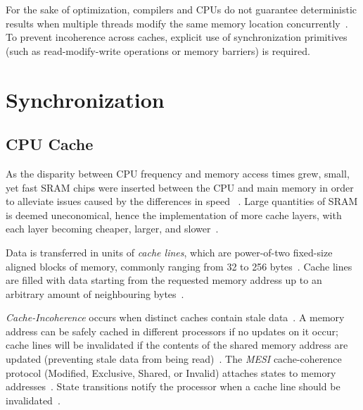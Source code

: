 For the sake of optimization, compilers and CPUs do not guarantee deterministic
results when multiple threads modify the same memory location
concurrently~\citep{drepper2007every}. To prevent incoherence across caches,
explicit use of synchronization primitives (such as read-modify-write
operations or memory barriers) is required.

\section{Synchronization}
\subsection{CPU Cache}
As the disparity between CPU frequency and memory access times grew, small, yet
fast SRAM chips were inserted between the CPU and main memory in order to alleviate issues
caused by the differences in speed
~\citep{cantrill2008real,drepper2007every,perfbook2021}. Large quantities of
SRAM is deemed uneconomical, hence the implementation of more cache layers,
with each layer becoming cheaper, larger, and
slower~\citep{drepper2007every,perfbook2021}.

Data is transferred in units of \emph{cache lines}, which are power-of-two
fixed-size aligned blocks of memory, commonly ranging from 32 to 256
bytes~\citep{perfbook2021_cacheline}. Cache lines are filled with data starting
from the requested memory address up to an arbitrary amount of neighbouring
bytes~\citep{perfbook2021_cacheline}.


\emph{Cache-Incoherence} occurs when distinct caches contain stale
data~\citep{herlihy2020art_cachecoherence}. A memory address
can be safely cached in different processors if no updates on it occur; 
cache lines will be invalidated if the contents of the shared memory address are
updated (preventing stale data from being
read)~\citep{herlihy2020art_cachecoherence}.
The \emph{MESI} cache-coherence protocol (Modified, Exclusive, Shared, or
Invalid) attaches states to memory
addresses~\citep{herlihy2020art_cachecoherence}. State transitions notify
the processor when a cache
line should be invalidated~\citep{herlihy2020art_cachecoherence}.


